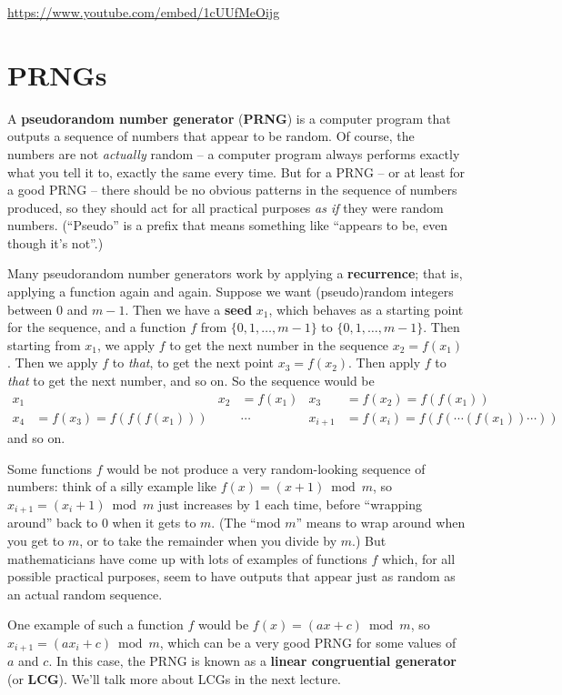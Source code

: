\documentclass[
  letterpaper,
  DIV=11,
  numbers=noendperiod]{scrreprt}
\theoremstyle{plain}
\theoremstyle{definition}
\theoremstyle{definition}
\theoremstyle{remark}
\begin{document}
\url{https://www.youtube.com/embed/1cUUfMeOijg}

\section{PRNGs}\label{prngs}

A \textbf{pseudorandom number generator} (\textbf{PRNG}) is a computer
program that outputs a sequence of numbers that appear to be random. Of
course, the numbers are not \emph{actually} random -- a computer program
always performs exactly what you tell it to, exactly the same every
time. But for a PRNG -- or at least for a good PRNG -- there should be
no obvious patterns in the sequence of numbers produced, so they should
act for all practical purposes \emph{as if} they were random numbers.
(``Pseudo'' is a prefix that means something like ``appears to be, even
though it's not''.)

Many pseudorandom number generators work by applying a
\textbf{recurrence}; that is, applying a function again and again.
Suppose we want (pseudo)random integers between \(0\) and \(m-1\). Then
we have a \textbf{seed} \(x_1\), which behaves as a starting point for
the sequence, and a function \(f\) from \(\{0, 1, \dots, m-1\}\) to
\(\{0, 1, \dots, m-1\}\). Then starting from \(x_1\), we apply \(f\) to
get the next number in the sequence \(x_2 = f(x_1)\). Then we apply
\(f\) to \emph{that}, to get the next point \(x_3 = f(x_2)\). Then apply
\(f\) to \emph{that} to get the next number, and so on. So the sequence
would be
\[ \begin{align} x_1& & x_2 &= f(x_1) & x_3 &= f(x_2) = f(f(x_1)) \\
x_4 &= f(x_3) = f(f(f(x_1))) & &\cdots & x_{i+1} &= f(x_i) =f(f(\cdots (f(x_1))\cdots))\end{align} \]
and so on.

Some functions \(f\) would be not produce a very random-looking sequence
of numbers: think of a silly example like \(f(x) = (x+1) \bmod m\), so
\(x_{i+1} = (x_i + 1) \bmod m\) just increases by 1 each time, before
``wrapping around'' back to 0 when it gets to \(m\). (The ``mod \(m\)''
means to wrap around when you get to \(m\), or to take the remainder
when you divide by \(m\).) But mathematicians have come up with lots of
examples of functions \(f\) which, for all possible practical purposes,
seem to have outputs that appear just as random as an actual random
sequence.

One example of such a function \(f\) would be \(f(x) = (ax+c) \bmod m\),
so \(x_{i+1} = (ax_i + c)\bmod m\), which can be a very good PRNG for
some values of \(a\) and \(c\). In this case, the PRNG is known as a
\textbf{linear congruential generator} (or \textbf{LCG}). We'll talk
more about LCGs in the next lecture.
\end{document}
